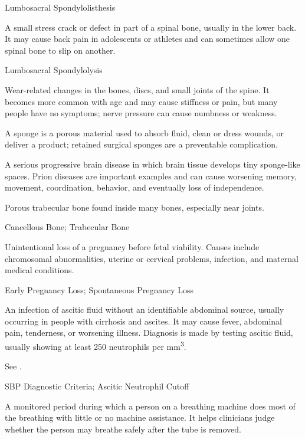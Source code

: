 \synonyms
Lumbosacral Spondylolisthesis

 A small stress crack or defect in part of a spinal bone, usually in the lower back. It may cause back pain in adolescents or athletes and can sometimes allow one spinal bone to slip on another.

\synonyms
Lumbosacral Spondylolysis

 Wear-related changes in the bones, discs, and small joints of the spine. It becomes more common with age and may cause stiffness or pain, but many people have no symptoms; nerve pressure can cause numbness or weakness.

 A sponge is a porous material used to absorb fluid, clean or dress wounds, or deliver a product; retained surgical sponges are a preventable complication.

 A serious progressive brain disease in which brain tissue develops tiny sponge-like spaces. Prion diseases are important examples and can cause worsening memory, movement, coordination, behavior, and eventually loss of independence.

 Porous trabecular bone found inside many bones, especially near joints.

\synonyms
Cancellous Bone; Trabecular Bone

 Unintentional loss of a pregnancy before fetal viability. Causes include chromosomal abnormalities, uterine or cervical problems, infection, and maternal medical conditions.

\synonyms
Early Pregnancy Loss; Spontaneous Pregnancy Loss

 An infection of ascitic fluid without an identifiable abdominal source, usually occurring in people with cirrhosis and ascites. It may cause fever, abdominal pain, tenderness, or worsening illness. Diagnosis is made by testing ascitic fluid, usually showing at least 250 neutrophils per mm\textsuperscript{3}.

 See .

\synonyms
SBP Diagnostic Criteria; Ascitic Neutrophil Cutoff

 A monitored period during which a person on a breathing machine does most of the breathing with little or no machine assistance. It helps clinicians judge whether the person may breathe safely after the tube is removed.

